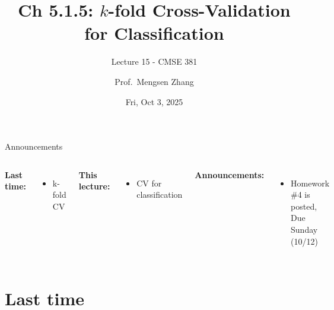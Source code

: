\documentclass[aspectratio=169,usenames,dvipsnames]{beamer}
\begin{document}
\title[]{Ch 5.1.5: $k$-fold Cross-Validation for Classification}
\subtitle{Lecture 15 - CMSE 381}
\date{Fri, Oct 3, 2025}



\author[Dr.~Zhang]{Prof.~Mengsen Zhang}

\begin{frame}
 \titlepage


\end{frame}
\begin{frame}[c]{Announcements}

\begin{columns}
\centering

	\textbf{Last time:}
	\begin{itemize}
		\item k-fold CV
	\end{itemize}
	\textbf{This lecture:}
	\begin{itemize}
		\item CV for classification
	\end{itemize}

\centering

\textbf{Announcements:}
	\begin{itemize}
		\item Homework \#4 is posted, Due Sunday (10/12)
	\end{itemize}
\end{columns}

\end{frame}

\section{Last time}
\end{document}
